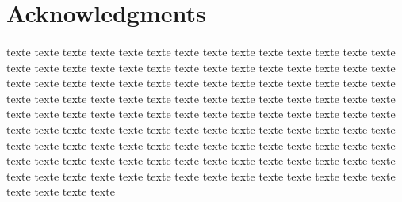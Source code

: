 \section*{Acknowledgments}
\paragraph{}

texte texte texte texte texte texte texte texte texte texte texte texte texte texte texte texte texte texte texte texte texte texte texte texte texte texte texte texte texte texte texte texte texte texte texte texte texte texte texte texte texte texte texte texte texte texte texte texte texte texte texte texte texte texte texte texte texte texte texte texte texte texte texte texte texte texte texte texte texte texte texte texte texte texte texte texte texte texte texte texte texte texte texte texte texte texte texte texte texte texte texte texte texte texte texte texte texte texte texte texte texte texte texte texte texte texte texte texte texte texte texte texte texte texte texte texte texte texte texte texte texte texte texte texte texte texte texte texte texte texte 